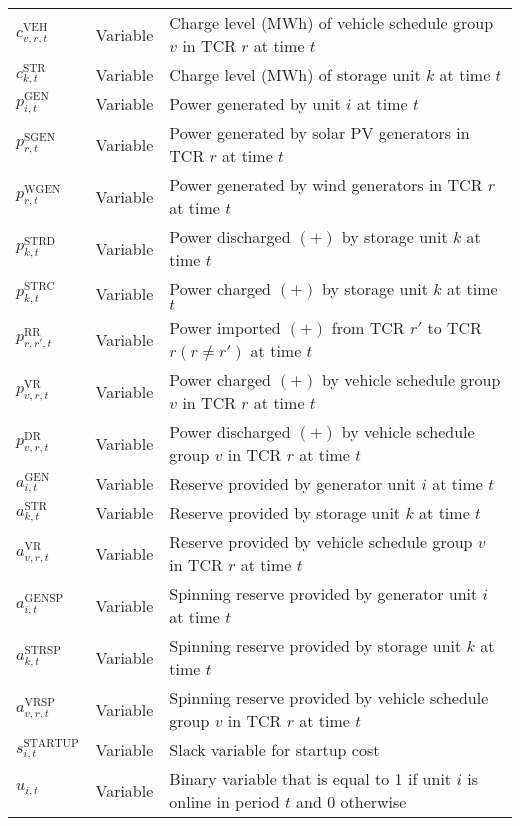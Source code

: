 \documentclass[9pt,twoside,lineno]{pnas-new}
\begin{document}
\begin{table}[!ht]
\begin{center}
\begin{tabular}{lll}
      $c^{\mathrm{VEH}}_{v,r,t}$ & Variable & Charge level (MWh) of vehicle schedule group $v$ in TCR $r$ at time $t$\\
      $c^{\mathrm{STR}}_{k,t}$ & Variable & Charge level (MWh) of storage unit $k$ at time $t$\\
      $p^{\mathrm{GEN}}_{i,t}$ & Variable & Power generated by unit $i$ at time $t$ \\
      $p^{\mathrm{SGEN}}_{r,t}$ & Variable & Power generated by solar PV generators in TCR $r$ at time $t$ \\
      $p^{\mathrm{WGEN}}_{r,t}$ & Variable & Power generated by wind generators in TCR $r$ at time $t$ \\
      $p^{\mathrm{STRD}}_{k,t}$ & Variable & Power discharged $(+)$ by storage unit $k$ at time $t$ \\
      $p^{\mathrm{STRC}}_{k,t}$ & Variable & Power charged $(+)$ by storage unit $k$ at time $t$ \\ 
      $p^{\mathrm{RR}}_{r,r',t}$ & Variable & Power imported $(+)$ from TCR $r'$ to TCR $r (r\neq r')$ at time $t$\\
      $p^{\mathrm{VR}}_{v,r,t}$ & Variable & Power charged $(+)$ by vehicle schedule group $v$ in TCR $
r$ at time $t$\\
      $p^{\mathrm{DR}}_{v,r,t}$ & Variable & Power discharged $(+)$ by vehicle schedule group $v$ in TCR $r$ at time $t$\\
      $a^{\mathrm{GEN}}_{i,t}$ & Variable & Reserve provided by generator unit $i$ at time $t$ \\
      $a^{\mathrm{STR}}_{k,t}$ & Variable & Reserve provided by storage unit $k$ at time $t$ \\
      $a^{\mathrm{VR}}_{v,r,t}$ & Variable & Reserve provided by vehicle schedule group $v$ in TCR $r$ at time $t$\\
      $a^{\mathrm{GENSP}}_{i,t}$ & Variable & Spinning reserve provided by generator unit $i$ at time $t$ \\
      $a^{\mathrm{
STRSP}}_{k,t}$ & Variable & Spinning reserve provided by storage unit $k$ at time $t$ \\
      $a^{\mathrm{VRSP}}_{v,r,t}$ & Variable & Spinning reserve provided by vehicle schedule group $v$ in TCR $
r$ at time $t$\\
      $s^{\mathrm{STARTUP}}_{i,t}$ & Variable & Slack variable for startup cost \\
      $u_{i,t} $ & Variable & Binary variable that is equal to 1 if unit $i$ is online in period $t$ and 0 otherwise \\

\end{tabular}
\end{center}
\end{table}
\end{document}
